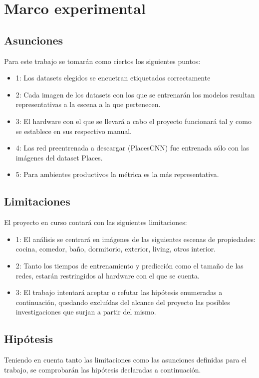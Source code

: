 \section{Marco experimental}
\subsection{Asunciones}
Para este trabajo se tomarán como ciertos los siguientes puntos:
\begin{itemize}
	\item 1: Los datasets elegidos se encuetran etiquetados correctamente 
	\item 2: Cada imagen de los datasets con los que se entrenarán los modelos resultan representativas a la escena a la que pertenecen.
	\item 3: El hardware con el que se llevará a cabo el proyecto funcionará tal y como se establece en sus respectivo manual.
	\item 4: Las red preentrenada a descargar (PlacesCNN) fue entrenada sólo con las imágenes del dataset Places.
	\item 5: Para ambientes productivos la métrica \cite{balanced_accuracy_score} es la más representativa.
\end{itemize}

\subsection{Limitaciones} \label{ssec:limitaciones}
El proyecto en curso contará con las siguientes limitaciones:
\begin{itemize}
	\item 1: El análisis se centrará en imágenes de las siguientes escenas de propiedades: cocina, comedor, baño, dormitorio, exterior, living, otros interior.
	\item 2: Tanto los tiempos de entrenamiento y predicción como el tamaño de las redes, estarán restringidos al hardware con el que se cuenta.
	\item 3: El trabajo intentará aceptar o refutar las hipótesis enumeradas a continuación, quedando excluídas del alcance del proyecto las posibles investigaciones que surjan a partir del mismo.
\end{itemize}

\subsection{Hipótesis}
Teniendo en cuenta tanto las limitaciones como las asunciones definidas para el trabajo, se comprobarán las hipótesis declaradas a continuación. 

